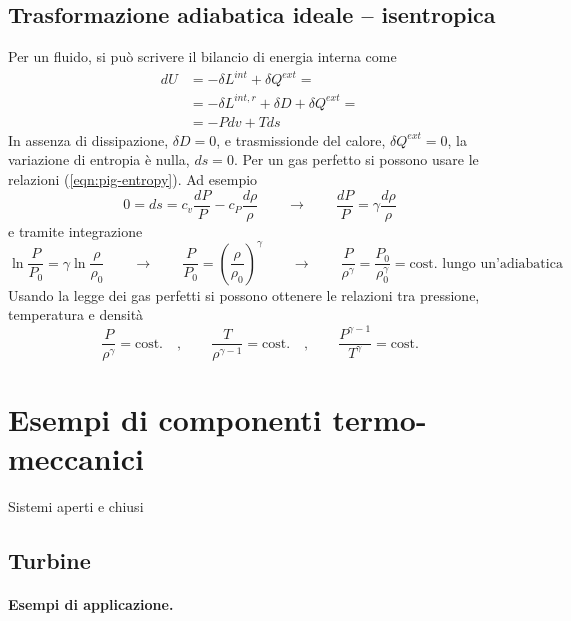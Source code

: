 \subsection{Trasformazione adiabatica ideale -- isentropica} Per un fluido, si può scrivere il bilancio di energia interna come
\begin{equation}
\begin{aligned}
    dU & = - \delta L^{int} + \delta Q^{ext} = \\
       & = - \delta L^{int,r} + \delta D + \delta Q^{ext} = \\
       & = - P dv + T ds
\end{aligned}
\end{equation}
In assenza di dissipazione, $\delta D = 0$, e trasmissionde del calore, $\delta Q^{ext} = 0$, la variazione di entropia è nulla, $ds = 0$.
Per un gas perfetto si possono usare le relazioni (\ref{eqn:pig-entropy}). Ad esempio
\begin{equation}
    0 = ds = c_v \dfrac{dP}{P} - c_P \dfrac{ d\rho}{\rho}
    \qquad \rightarrow \qquad
    \dfrac{dP}{P} = \gamma \dfrac{d\rho}{\rho}
\end{equation}
e tramite integrazione
\begin{equation}
    \ln \dfrac{P}{P_0} = \gamma \ln \dfrac{\rho}{\rho_0} \qquad \rightarrow \qquad 
    \dfrac{P}{P_0} = \left( \dfrac{\rho}{\rho_0} \right)^{\gamma} \qquad \rightarrow \qquad
    \dfrac{P}{\rho^\gamma} =  \dfrac{P_0}{\rho_0^\gamma} = \text{cost. lungo un'adiabatica}
\end{equation}
Usando la legge dei gas perfetti si possono ottenere le relazioni tra pressione, temperatura e densità
\begin{equation}\label{eqn:pig-isentropic}
    \dfrac{P}{\rho^\gamma} = \text{cost.} \quad , \qquad
    \dfrac{T}{\rho^{\gamma-1}} = \text{cost.} \quad , \qquad
    \dfrac{P^{\gamma-1}}{T^{\gamma}} = \text{cost.} 
\end{equation}

\section{Esempi di componenti termo-meccanici}
{\color{red} Sistemi aperti e chiusi}
\subsection{Turbine}
\paragraph{Esempi di applicazione.}
